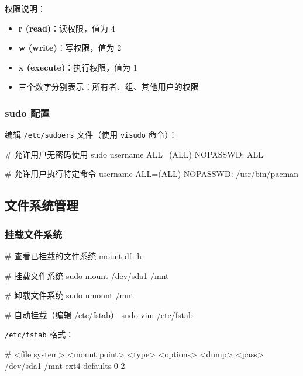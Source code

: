 权限说明：

\begin{itemize}
  \item \textbf{r (read)}：读权限，值为 4
  \item \textbf{w (write)}：写权限，值为 2
  \item \textbf{x (execute)}：执行权限，值为 1
  \item 三个数字分别表示：所有者、组、其他用户的权限
\end{itemize}

\subsubsection{sudo 配置}


编辑 \lstinline{/etc/sudoers} 文件（使用 \lstinline{visudo} 命令）：

\begin{lstcode}[numbers=none]
  # 允许用户无密码使用 sudo
  username ALL=(ALL) NOPASSWD: ALL

  # 允许用户执行特定命令
  username ALL=(ALL) NOPASSWD: /usr/bin/pacman
\end{lstcode}

\subsection{文件系统管理}

\subsubsection{挂载文件系统}


\begin{lstcode}[numbers=none]
  # 查看已挂载的文件系统
  mount
  df -h

  # 挂载文件系统
  sudo mount /dev/sda1 /mnt

  # 卸载文件系统
  sudo umount /mnt

  # 自动挂载（编辑 /etc/fstab）
  sudo vim /etc/fstab
\end{lstcode}

\lstinline{/etc/fstab} 格式：

\begin{lstcode}[numbers=none]
  # <file system> <mount point> <type> <options> <dump> <pass>
  /dev/sda1  /mnt  ext4  defaults  0  2
\end{lstcode}

